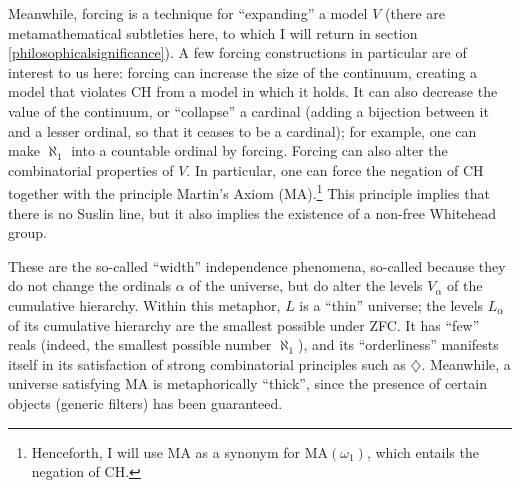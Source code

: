 \documentclass[letterpaper,12pt]{article}
\begin{document}
Meanwhile, forcing is a technique for ``expanding'' a model $V$ (there are metamathematical subtleties here, to which I will return in section \ref{philosophicalsignificance}). A few forcing constructions in particular are of interest to us here: forcing can increase the size of the continuum, creating a model that violates CH from a model in which it holds. It can also decrease the value of the continuum, or ``collapse'' a cardinal (adding a bijection between it and a lesser ordinal, so that it ceases to be a cardinal); for example, one can make $\aleph_1$ into a countable ordinal by forcing. Forcing can also alter the combinatorial properties of $V$. In particular, one can force the negation of CH together with the principle Martin's Axiom (MA).\footnote{Henceforth, I will use MA as a synonym for $\mathrm{MA}(\omega_1)$, which entails the negation of CH.} This principle implies that there is no Suslin line, but it also implies the existence of a non-free Whitehead group.

These are the so-called ``width'' independence phenomena, so-called because they do not change the ordinals $\alpha$ of the universe, but do alter the levels $V_\alpha$ of the cumulative hierarchy. Within this metaphor, $L$ is a ``thin'' universe; the levels $L_\alpha$ of its cumulative hierarchy are the smallest possible under ZFC. It has ``few'' reals (indeed, the smallest possible number $\aleph_1$), and its ``orderliness'' manifests itself in its satisfaction of strong combinatorial principles such as $\diamondsuit$. Meanwhile, a universe satisfying MA is metaphorically ``thick'', since the presence of certain objects (generic filters) has been guaranteed.
\end{document}
